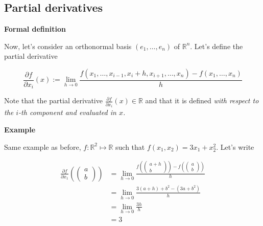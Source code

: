 \documentclass{tufte-handout}
\begin{document}
\subsection{Partial derivatives}
\textbf{Formal definition}

Now, let's consider an orthonormal basis $ (e_1, \ldots, e_n ) $ of $ \mathbb{R}^n $. Let's define the partial derivative

$$ \frac{\partial f}{\partial x_i}(x) := \lim\limits_{h \rightarrow 0} \frac{f(x_1, \ldots, x_{i-1}, x_i + h, x_{i+1}, \ldots, x_n) - f(x_1,\ldots, x_n)}{h}
$$

Note that the partial derivative $ \frac{\partial f}{\partial x_i}(x) \in \mathbb{R} $ and that it is defined \emph{with respect to the $i$-th component and evaluated in $ x $.}

\textbf{Example}

Same example as before, $ f : \mathbb{R}^2 \mapsto \mathbb{R} $ such that $ f(x_1,x_2) = 3x_1 + x_2^2 $. Let's write

\begin{align*}
\frac{\partial f}{\partial x_1}(\begin{pmatrix}
a\\b
\end{pmatrix}) &= \lim\limits_{h \rightarrow 0} \frac{f(\begin{pmatrix}
a + h\\b
\end{pmatrix}) - f(\begin{pmatrix}
a \\b
\end{pmatrix})}{h}\\
&= \lim\limits_{h \rightarrow 0} \frac{3(a+h) + b^2 - (3a + b^2)}{h}\\
&= \lim\limits_{h \rightarrow 0} \frac{3h}{h}\\
&= 3
\end{align*}
\end{document}
